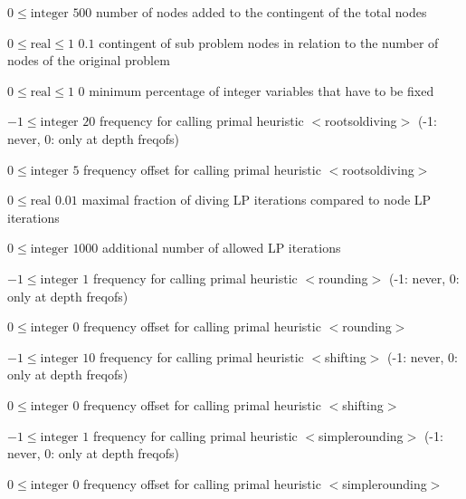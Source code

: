 %
{$0\leq\textrm{integer}$}%
{$500$}%
{number of nodes added to the contingent of the total nodes}%
{}

%
{$0\leq\textrm{real}\leq1$}%
{$0.1$}%
{contingent of sub problem nodes in relation to the number of nodes of the original problem}%
{}

%
{$0\leq\textrm{real}\leq1$}%
{$0$}%
{minimum percentage of integer variables that have to be fixed }%
{}

%
{$-1\leq\textrm{integer}$}%
{$20$}%
{frequency for calling primal heuristic $<$rootsoldiving$>$ (-1: never, 0: only at depth freqofs)}%
{}

%
{$0\leq\textrm{integer}$}%
{$5$}%
{frequency offset for calling primal heuristic $<$rootsoldiving$>$}%
{}

%
{$0\leq\textrm{real}$}%
{$0.01$}%
{maximal fraction of diving LP iterations compared to node LP iterations}%
{}

%
{$0\leq\textrm{integer}$}%
{$1000$}%
{additional number of allowed LP iterations}%
{}

%
{$-1\leq\textrm{integer}$}%
{$1$}%
{frequency for calling primal heuristic $<$rounding$>$ (-1: never, 0: only at depth freqofs)}%
{}

%
{$0\leq\textrm{integer}$}%
{$0$}%
{frequency offset for calling primal heuristic $<$rounding$>$}%
{}

%
{$-1\leq\textrm{integer}$}%
{$10$}%
{frequency for calling primal heuristic $<$shifting$>$ (-1: never, 0: only at depth freqofs)}%
{}

%
{$0\leq\textrm{integer}$}%
{$0$}%
{frequency offset for calling primal heuristic $<$shifting$>$}%
{}

%
{$-1\leq\textrm{integer}$}%
{$1$}%
{frequency for calling primal heuristic $<$simplerounding$>$ (-1: never, 0: only at depth freqofs)}%
{}

%
{$0\leq\textrm{integer}$}%
{$0$}%
{frequency offset for calling primal heuristic $<$simplerounding$>$}%
{}

